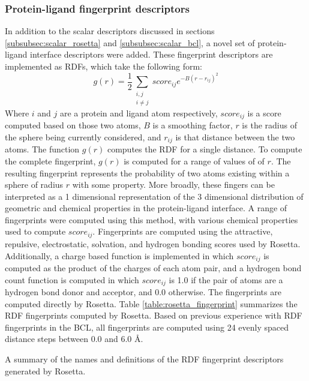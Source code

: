 \subsubsection{Protein-ligand fingerprint descriptors}
In addition to the scalar descriptors  discussed in sections \ref{subsubsec:scalar_rosetta} and \ref{subsubsec:scalar_bcl}, a novel set of protein-ligand interface descriptors were added.
These fingerprint descriptors are implemented as \ac{RDF}s, which take the following form:
\begin{equation}
g(r) = \frac{1}{2}\sum_{\substack{i,j \\ i \neq j}}score_{ij}e^{-B(r-r_{ij})^{2}}
\end{equation}
Where $i$ and $j$ are a protein and ligand atom respectively, $score_{ij}$ is a score computed based on those two atoms, $B$ is a smoothing factor, $r$ is the radius of the sphere being currently considered, and $r_{ij}$ is that distance between the two atoms.
The function $g(r)$ computes the \ac{RDF} for a single distance.  To compute the complete fingerprint, $g(r)$ is computed for a range of values of of $r$.
The resulting fingerprint represents the probability of two atoms existing within a sphere of radius $r$ with some property. 
More broadly, these fingers can be interpreted as a 1 dimensional representation of the 3 dimensional distribution of geometric and chemical properties in the protein-ligand interface. 
A range of fingerprints were computed using this method, with various chemical properties used to compute $score_{ij}$.
Fingerprints are computed using the attractive, repulsive, electrostatic, solvation, and hydrogen bonding scores used by Rosetta.  Additionally, a charge based function is implemented in which $score_{ij}$ is computed as the product of the charges of each atom pair, and a hydrogen bond count function is computed in which $score_{ij}$ is 1.0 if the pair of atoms are a hydrogen bond donor and acceptor, and 0.0 otherwise.
The fingerprints are computed directly by Rosetta.
Table \ref{table:rosetta_fingerprint} summarizes the \ac{RDF} fingerprints computed by Rosetta.
Based on previous experience with \ac{RDF} fingerprints in the \ac{BCL}, all fingerprints are computed using 24 evenly spaced distance steps between 0.0 and 6.0 \AA.
\begin{table}
\scriptsize
\renewcommand{\tabcolsep}{0.09cm}
\centering

\caption{A summary of the names and definitions of the \acs{RDF} fingerprint descriptors generated by Rosetta. }
\label{table:rosetta_fingerprint}
\end{table}

